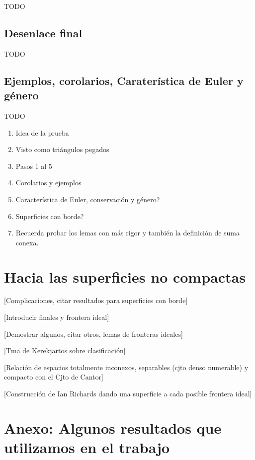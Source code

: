 \documentclass[a4paper,11pt,spanish, twoside, leqno]{tfg-uam}
\theoremstyle{definition}
\begin{document}
TODO

\section{Desenlace final}
TODO

\section{Ejemplos, corolarios, Caraterística de Euler y género}
TODO



\begin{enumerate}
\item Idea de la prueba
\item Visto como triángulos pegados
\item Pasos 1 al 5
\item Corolarios y ejemplos
\item Característica de Euler, conservación y género?
\item Superficies con borde?
\item Recuerda probar los lemas con más rigor y también la definición de suma conexa.
\end{enumerate}









\chapter{Hacia las superficies no compactas}
[Complicaciones, citar resultados para superficies con borde]

[Introducir finales y frontera ideal]

[Demostrar algunos, citar otros, lemas de fronteras ideales]

[Tma de Kerekjartos sobre clasificación]

[Relación de espacios totalmente inconexos, separables (cjto denso 
numerable) y compacto con el Cjto de Cantor]

[Construcción de Ian Richards dando una superficie a cada posible frontera ideal]











\chapter{Anexo: Algunos resultados que utilizamos en el trabajo}
\end{document}
